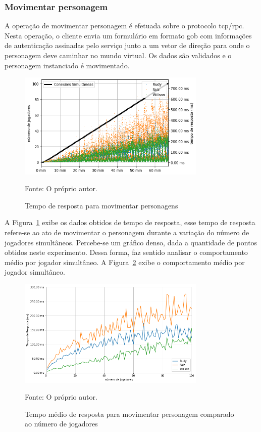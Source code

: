 \subsubsection{Movimentar personagem}

A operação de movimentar personagem é efetuada sobre o protocolo \ac{tcp}/\ac{rpc}.
%
Nesta operação, o cliente envia um formulário em formato \ac{gob} com informações de autenticação assinadas pelo serviço junto a um vetor de direção para onde o personagem deve caminhar no mundo virtual.
%
Os dados são validados e o personagem instanciado é movimentado.

\begin{figure}[htb!]
  \caption{Tempo de resposta para movimentar personagens}
  \label{fig:move_character_request_time}
  \includegraphics[width=0.8\textwidth]{figuras/analise/rt/move_character_request_time}
  \centering

  Fonte: O próprio autor.
\end{figure}

A Figura~\ref{fig:move_character_request_time} exibe os dados obtidos de tempo de resposta, esse tempo de resposta refere-se ao ato de movimentar o personagem durante a variação do número de jogadores simultâneos.
%
Percebe-se um gráfico denso, dada a quantidade de pontos obtidos neste experimento.
%
Dessa forma, faz sentido analisar o comportamento médio por jogador simultâneo.
%
A Figura~\ref{fig:spawn_character_request_time_per_concurrency} exibe o comportamento médio por jogador simultâneo.

\begin{figure}[htb!]
  \caption{Tempo médio de resposta para movimentar personagem comparado ao número de jogadores}
  \label{fig:spawn_character_request_time_per_concurrency}
  \includegraphics[width=0.8\textwidth]{figuras/analise/rt/spawn_character_request_time_per_concurrency}
  \centering

  Fonte: O próprio autor.
\end{figure}

